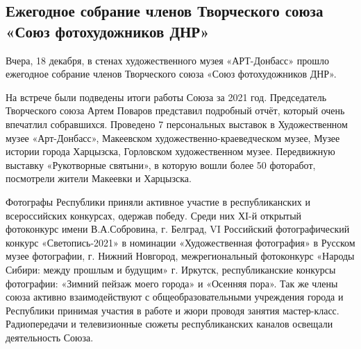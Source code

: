  
 
 
 
 
\subsection{Ежегодное собрание членов Творческого союза «Союз фотохудожников ДНР»}
\label{sec:19_12_2021.stz.news.dnr.artdonbass.1.sojuz_fotohudozhnikov_dnr}


Вчера, 18 декабря, в стенах художественного музея «АРТ-Донбасс» прошло
ежегодное собрание членов Творческого союза «Союз фотохудожников ДНР».


На встрече были подведены итоги работы Союза за 2021 год.  Председатель
Творческого союза Артем Поваров представил подробный отчёт, который очень
впечатлил собравшихся. Проведено 7 персональных выставок в Художественном музее
«Арт-Донбасс», Макеевском художественно-краеведческом музее, Музее истории
города Харцызска, Горловском художественном музее. Передвижную выставку
«Рукотворные святыни», в которую вошли более 50 фоторабот, посмотрели жители
Макеевки и Харцызска. 


Фотографы Республики приняли активное участие в
республиканских и всероссийских конкурсах, одержав победу. Среди них ХI-й
открытый фотоконкурс имени В.А.Собровина, г. Белград, VI Российский
фотографический конкурс «Светопись-2021» в номинации «Художественная
фотография» в Русском музее фотографии, г. Нижний Новгород, межрегиональный
фотоконкурс «Народы Сибири: между прошлым и будущим» г. Иркутск,
республиканские конкурсы фотографии: «Зимний пейзаж моего города» и «Осенняя
пора». Так же члены союза активно взаимодействуют с общеобразовательными
учреждения города и Республики принимая участия в работе и жюри проводя занятия
мастер-класс. Радиопередачи и телевизионные сюжеты республиканских каналов
освещали деятельность Союза.

